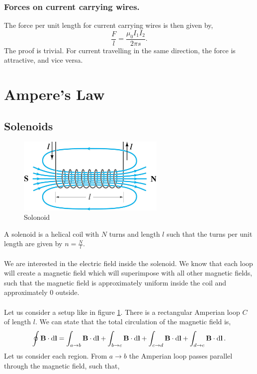 \documentclass{book}
\begin{document}
\subsubsection{Forces on current carrying wires.}
The force per unit length for current carrying wires is then given by,
\begin{equation}
    \frac{F}{l} = \frac{\mu_0 I_1I_2}{2\pi s}.
\end{equation}
The proof is trivial. For current travelling in the same direction, the force is attractive, and vice versa.
\section{Ampere's Law}
\subsection{Solenoids}
\begin{figure}
    \centering
    \includegraphics[width=200pt]{solenoid-magnetic-field.png}
    \caption{Solonoid}
    \label{fig:solonoid}
\end{figure}
A solenoid is a helical coil with $N$ turns and length $l$ such that the turns per unit length are given by $n = \frac{N}{l}$. \\\\
We are interested in the electric field inside the solenoid. We know that each loop will create a magnetic field which will superimpose with all other magnetic fields, such that the magnetic field is approximately uniform inside the coil and approximately 0 outside. 
\\\\
Let us consider a setup like in figure \ref{fig:solonoid}. There is a rectangular Amperian loop $C$ of length $l$. We can state that the total circulation of the magnetic field is,
\begin{equation}
    \oint \vb{B}\cdot\dd{\vb{l}} = \int_{a\to b} \vb{B}\cdot\dd{\vb{l}} + \int_{b\to c} \vb{B}\cdot\dd{\vb{l}} + \int_{c\to d} \vb{B}\cdot\dd{\vb{l}} + \int_{d\to c} \vb{B}\cdot\dd{\vb{l}}.
\end{equation}
Let us consider each region. From $a\to b$ the Amperian loop passes parallel through the magnetic field, such that,
\end{document}
